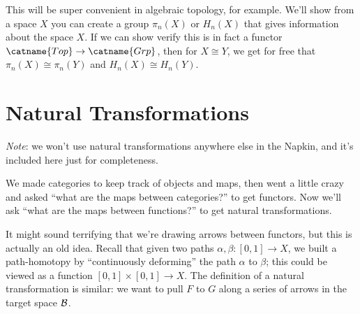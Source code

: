 \documentclass[11pt]{scrreprt}
\begin{document}
This will be super convenient in algebraic topology, for example.
We'll show from a space $X$ you can create a group $\pi_n(X)$ or $H_n(X)$ that
gives information about the space $X$.
If we can show verify this is in fact a functor $\catname{Top} \to \catname{Grp}$,
then for $X \cong Y$, we get for free that $\pi_n(X) \cong \pi_n(Y)$ and $H_n(X) \cong H_n(Y)$.

\section{Natural Transformations}
\emph{Note}: we won't use natural transformations anywhere else in the Napkin,
and it's included here just for completeness.

We made categories to keep track of objects and maps, then went a little crazy and asked
``what are the maps between categories?'' to get functors.
Now we'll ask ``what are the maps between functions?'' to get natural transformations.

It might sound terrifying that we're drawing arrows between functors, but this is actually an old idea.
Recall that given two paths $\alpha, \beta : [0,1] \to X$,
we built a path-homotopy by ``continuously deforming'' the path $\alpha$ to $\beta$;
this could be viewed as a function $[0,1] \times [0,1] \to X$.
The definition of a natural transformation is similar: we want to pull $F$ to $G$
along a series of arrows in the target space $\mathcal B$.
\end{document}
